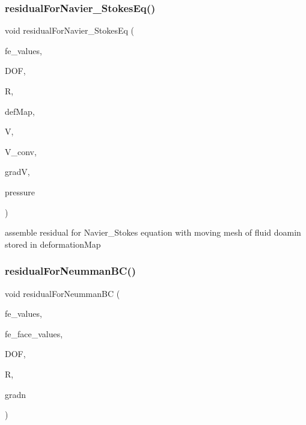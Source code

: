 \subsubsection{\texorpdfstring{residualForNavier\_StokesEq()}{residualForNavier\_StokesEq()}}
{\footnotesize\ttfamily void residual\+For\+Navier\+\_\+\+Stokes\+Eq (\begin{DoxyParamCaption}\item[{const F\+E\+Values$<$ dim $>$ \&}]{fe\+\_\+values,  }\item[{unsigned int}]{D\+OF,  }\item[{Table$<$ 1, T $>$ \&}]{R,  }\item[{\mbox{\hyperlink{structdeformation_map}{deformation\+Map}}$<$ T, dim $>$ \&}]{def\+Map,  }\item[{Table$<$ 2, T $>$ \&}]{V,  }\item[{dealii\+::\+Table$<$ 2, double $>$ \&}]{V\+\_\+conv,  }\item[{Table$<$ 3, T $>$ \&}]{gradV,  }\item[{dealii\+::\+Table$<$ 1, T $>$ \&}]{pressure }\end{DoxyParamCaption})}

assemble residual for Navier\+\_\+\+Stokes equation with moving mesh of fluid doamin stored in deformation\+Map \mbox{\label{class_residual_a4c8fd158c8034b25780abfe785755baa}} 
\subsubsection{\texorpdfstring{residualForNeummanBC()}{residualForNeummanBC()}\hspace{0.1cm}{\footnotesize\ttfamily [1/4]}}
{\footnotesize\ttfamily void residual\+For\+Neumman\+BC (\begin{DoxyParamCaption}\item[{const F\+E\+Values$<$ dim $>$ \&}]{fe\+\_\+values,  }\item[{const F\+E\+Face\+Values$<$ dim $>$ \&}]{fe\+\_\+face\+\_\+values,  }\item[{unsigned int}]{D\+OF,  }\item[{dealii\+::\+Table$<$ 1, T $>$ \&}]{R,  }\item[{dealii\+::\+Table$<$ 2, T $>$ \&}]{gradn }\end{DoxyParamCaption})}

